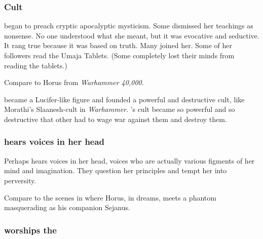 \subsubsection{Cult}
\Tiamat began to preach cryptic apocalyptic mysticism. 
Some dismissed her teachings as nonsense. 
No one understood what she meant, but it was evocative and seductive.
It rang true because it was based on truth.
Many joined her.
Some of her followers read the Umaja Tablets. 
(Some completely lost their minds from reading the tablets.)

Compare to Horus from \emph{Warhammer 40,000}.

\Tiamat became a Lucifer-like figure and founded a powerful and destructive cult, like Morathi's Slaanesh-cult in \emph{Warhammer}. 
\Tiamat's cult became so powerful and so destructive that other \dragons had to wage war against them and destroy them.





\subsubsection{\Tiamat{} hears voices in her head}
Perhaps \Tiamat{} hears voices in her head, voices who are actually various figments of her mind and imagination. 
They question her principles and tempt her into perversity. 

Compare to the scenes in  where Horus, in dreams, meets a phantom masquerading as his companion Sejanus. 





\subsubsection{\Tiamat{} worships the \xss}

